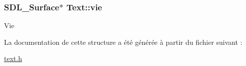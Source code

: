 \subsubsection[{\texorpdfstring{vie}{vie}}]{\setlength{\rightskip}{0pt plus 5cm}S\+D\+L\+\_\+\+Surface$\ast$ Text\+::vie}\hypertarget{structText_a0fcc09b9e71277a628a94d5cc1009e82}{}\label{structText_a0fcc09b9e71277a628a94d5cc1009e82}
Vie 

La documentation de cette structure a été générée à partir du fichier suivant \+:\begin{DoxyCompactItemize}
\item 
\hyperlink{text_8h}{text.\+h}\end{DoxyCompactItemize}
